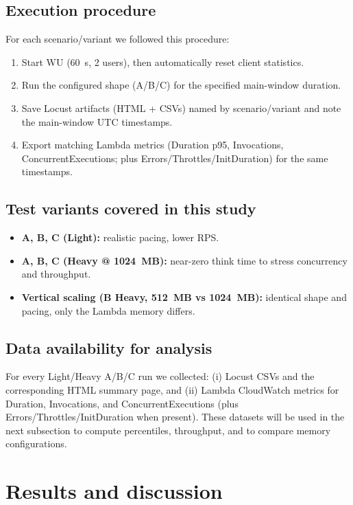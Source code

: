 \documentclass[11pt,a4paper]{article}
\begin{document}
\subsection{Execution procedure}
For each scenario/variant we followed this procedure:
\begin{enumerate}
  \item Start WU (\SI{60}{s}, 2 users), then automatically reset client statistics.
  \item Run the configured shape (A/B/C) for the specified main-window duration.
  \item Save Locust artifacts (HTML + CSVs) named by scenario/variant and note the main-window UTC timestamps.
  \item Export matching Lambda metrics (Duration p95, Invocations, ConcurrentExecutions; plus Errors/Throttles/InitDuration) for the same timestamps.
\end{enumerate}

\subsection{Test variants covered in this study}
\begin{itemize}
  \item \textbf{A, B, C (Light):} realistic pacing, lower RPS.
  \item \textbf{A, B, C (Heavy @ \SI{1024}{MB}):} near-zero think time to stress concurrency and throughput.
  \item \textbf{Vertical scaling (B Heavy, \SI{512}{MB} vs \SI{1024}{MB}):} identical shape and pacing, only the Lambda memory differs.
\end{itemize}

\subsection{Data availability for analysis}
For every Light/Heavy A/B/C run we collected: (i) Locust CSVs and the corresponding HTML summary page, and (ii) Lambda CloudWatch metrics for Duration, Invocations, and ConcurrentExecutions (plus Errors/Throttles/InitDuration when present). These datasets will be used in the next subsection to compute percentiles, throughput, and to compare memory configurations.

\section{Results and discussion}
\end{document}
